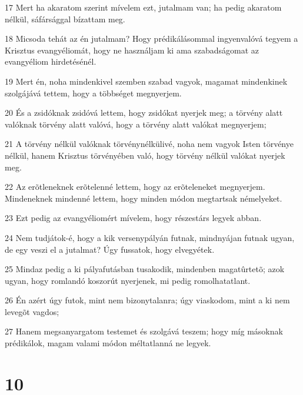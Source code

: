 \par 17 Mert ha akaratom szerint mívelem ezt, jutalmam van; ha pedig akaratom nélkül, sáfársággal  bízattam meg.
\par 18 Micsoda tehát az én jutalmam? Hogy prédikálásommal ingyenvalóvá tegyem a Krisztus evangyéliomát, hogy ne használjam ki ama  szabadságomat az evangyéliom hirdetésénél.
\par 19 Mert én, noha mindenkivel szemben szabad vagyok, magamat mindenkinek szolgájává tettem, hogy a többséget megnyerjem.
\par 20 És a zsidóknak zsidóvá lettem, hogy zsidókat nyerjek meg; a törvény alatt valóknak törvény alatt valóvá, hogy a törvény alatt valókat megnyerjem;
\par 21 A törvény nélkül valóknak törvénynélkülivé, noha nem vagyok Isten törvénye nélkül, hanem Krisztus törvényében való, hogy törvény nélkül valókat nyerjek meg.
\par 22 Az erõtleneknek erõtelenné lettem, hogy az erõteleneket megnyerjem. Mindeneknek mindenné  lettem, hogy minden módon megtartsak némelyeket.
\par 23 Ezt pedig az evangyéliomért mívelem, hogy részestárs legyek abban.
\par 24 Nem tudjátok-é, hogy a kik versenypályán futnak, mindnyájan futnak ugyan, de egy veszi el a jutalmat? Úgy fussatok, hogy elvegyétek.
\par 25 Mindaz pedig a ki pályafutásban tusakodik, mindenben magatûrtetõ; azok ugyan, hogy romlandó koszorút nyerjenek, mi pedig  romolhatatlant.
\par 26 Én azért úgy futok, mint nem bizonytalanra; úgy viaskodom, mint a ki nem levegõt vagdos;
\par 27 Hanem megsanyargatom testemet és szolgává teszem; hogy míg másoknak prédikálok, magam valami módon méltatlanná ne legyek.

\chapter{10}

